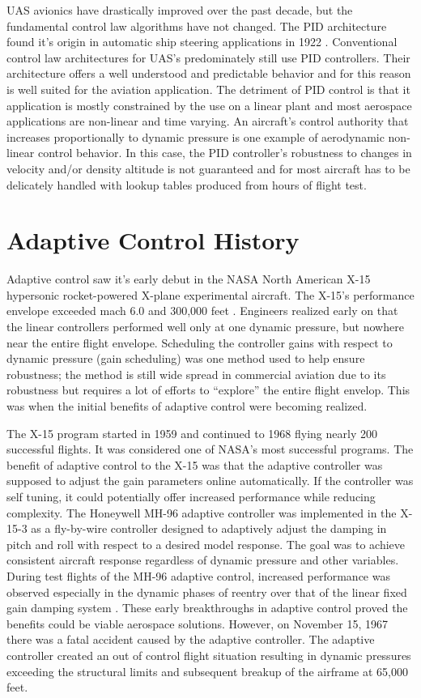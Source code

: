 UAS avionics have drastically improved over the past decade, but the fundamental control law algorithms have not changed.  The PID architecture found it's origin in automatic ship steering applications in 1922 \cite{minorsky1922pid}.  Conventional control law architectures for UAS's predominately still use PID controllers.  Their architecture offers a well understood and predictable behavior and for this reason is well suited for the aviation application.  The detriment of PID control is that it application is mostly constrained by the use on a linear plant and most aerospace applications are non-linear and time varying.   An aircraft's control authority that increases proportionally to dynamic pressure is one example of aerodynamic non-linear control behavior.  In this case, the PID controller's robustness to changes in velocity and/or density altitude is not guaranteed and for most aircraft has to be delicately handled with lookup tables produced from hours of flight test.

\section{Adaptive Control History}\label{history}
Adaptive control saw it's early debut in the NASA North American X-15 hypersonic rocket-powered X-plane experimental aircraft.  The X-15's performance envelope exceeded mach 6.0 and 300,000 feet \cite{jenkins2000x15specs}.  Engineers realized early on that the linear controllers performed well only at one dynamic pressure, but nowhere near the entire flight envelope.  Scheduling the controller gains with respect to dynamic pressure (gain scheduling) was one method used to help ensure robustness; the method is still wide spread in commercial aviation due to its robustness but requires a lot of efforts to ``explore'' the entire flight envelop.  This was when the initial benefits of adaptive control were becoming realized.

The X-15 program started in 1959 and continued to 1968 flying nearly 200 successful flights.  It was considered one of NASA's most successful programs.  The benefit of adaptive control to the X-15 was that the adaptive controller was supposed to adjust the gain parameters online automatically.  If the controller was self tuning, it could potentially offer increased performance while reducing complexity.  The Honeywell MH-96 adaptive controller was implemented in the X-15-3 as a fly-by-wire controller designed to adaptively adjust the damping in pitch and roll with respect to a desired model response.  The goal was to achieve consistent aircraft response regardless of dynamic pressure and other variables.  During test flights of the MH-96 adaptive control, increased performance was observed especially in the dynamic phases of reentry over that of the linear fixed gain damping system \cite{dydek2010adaptive}.  These early breakthroughs in adaptive control proved the benefits could be viable aerospace solutions.  However, on November 15, 1967 there was a fatal accident caused by the adaptive controller.  The adaptive controller created an out of control flight situation resulting in dynamic pressures exceeding the structural limits and subsequent breakup of the airframe at 65,000 feet.

